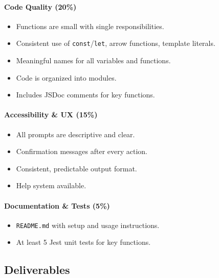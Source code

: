 \documentclass[
  justified,
  openright,
]{tufte-book}
\let\subsubsection\paragraph
\let\paragraph\paragraph
\let\subsubsection\paragraph
\let\paragraph\paragraph
\providecommand{\tightlist}{%
  \setlength{\itemsep}{0pt}\setlength{\parskip}{0pt}}
\begin{document}
\subsubsection{Code Quality (20\%)}\label{code-quality-20}

\begin{itemize}
\tightlist
\item[$\square$]
  Functions are small with single responsibilities.
\item[$\square$]
  Consistent use of \texttt{const}/\texttt{let}, arrow functions,
  template literals.
\item[$\square$]
  Meaningful names for all variables and functions.
\item[$\square$]
  Code is organized into modules.
\item[$\square$]
  Includes JSDoc comments for key functions.
\end{itemize}

\subsubsection{Accessibility \& UX (15\%)}\label{accessibility-ux-15}

\begin{itemize}
\tightlist
\item[$\square$]
  All prompts are descriptive and clear.
\item[$\square$]
  Confirmation messages after every action.
\item[$\square$]
  Consistent, predictable output format.
\item[$\square$]
  Help system available.
\end{itemize}

\subsubsection{Documentation \& Tests
(5\%)}\label{documentation-tests-5}

\begin{itemize}
\tightlist
\item[$\square$]
  \texttt{README.md} with setup and usage instructions.
\item[$\square$]
  At least 5 Jest unit tests for key functions.
\end{itemize}

\subsection{Deliverables}\label{deliverables}
\end{document}
